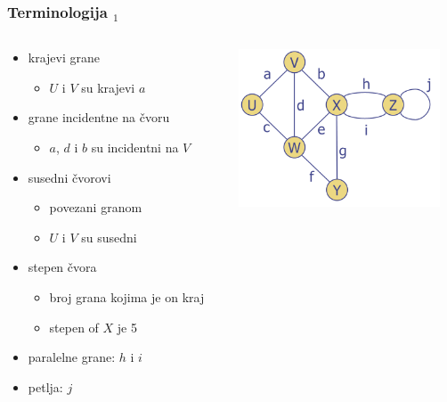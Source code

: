 \documentclass[compress]{beamer}
\begin{document}
\begin{frame}[fragile]
  \frametitle{Terminologija $_{1}$}
  \begin{columns}
    \begin{column}[t]{6cm}
      \begin{itemize}
        \item krajevi grane
        \begin{itemize}
          \item $U$ i $V$ su krajevi $a$
        \end{itemize}
        \item grane incidentne na čvoru
        \begin{itemize}
          \item $a$, $d$ i $b$ su incidentni na $V$
        \end{itemize}
        \item susedni čvorovi
        \begin{itemize}
          \item povezani granom
          \item $U$ i $V$ su susedni
        \end{itemize}
        \item stepen čvora
        \begin{itemize}
          \item broj grana kojima je on kraj
          \item stepen of $X$ je 5
        \end{itemize}
        \item paralelne grane: $h$ i $i$
        \item petlja: $j$
      \end{itemize}
    \end{column}
    \begin{column}[t]{6cm}
      \begin{center}
        \includegraphics[width=6cm]{asp-14-pic04.png}
      \end{center}
    \end{column}
  \end{columns}
\end{frame}
\end{document}
